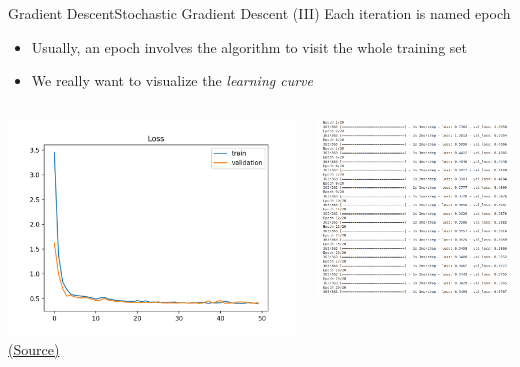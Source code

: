 \documentclass[10pt,compress]{beamer} %
\begin{document}
\begin{frame}{Gradient Descent}{Stochastic Gradient Descent (III)}
    Each iteration is named \alert{epoch}
    \begin{itemize}
	\item Usually, an epoch involves the algorithm to visit the whole training set
	\item We really want to visualize the \textit{learning curve}
    \end{itemize}

    \begin{columns}
	\includegraphics[width=\linewidth]{figs/loss.png}
	\centering \scriptsize \href{https://machinelearningmastery.com/learning-curves-for-diagnosing-machine-learning-model-performance/}{(Source)}

	\includegraphics[width=\linewidth]{figs/keras-output.png}\\
    \end{columns}
\end{frame}
\end{document}
